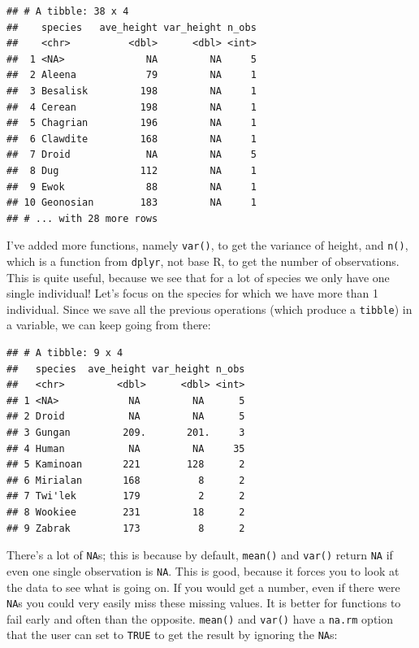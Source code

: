 \documentclass[]{gitbook}
\newenvironment{Shaded}{\begin{snugshade}}{\end{snugshade}}
\newcommand{\DecValTok}[1]{\textcolor[rgb]{0.00,0.00,0.81}{#1}}
\newcommand{\KeywordTok}[1]{\textcolor[rgb]{0.13,0.29,0.53}{\textbf{#1}}}
\newcommand{\NormalTok}[1]{#1}
\newcommand{\OperatorTok}[1]{\textcolor[rgb]{0.81,0.36,0.00}{\textbf{#1}}}
\newcommand{\StringTok}[1]{\textcolor[rgb]{0.31,0.60,0.02}{#1}}
\begin{document}
\begin{verbatim}
## # A tibble: 38 x 4
##    species   ave_height var_height n_obs
##    <chr>          <dbl>      <dbl> <int>
##  1 <NA>              NA         NA     5
##  2 Aleena            79         NA     1
##  3 Besalisk         198         NA     1
##  4 Cerean           198         NA     1
##  5 Chagrian         196         NA     1
##  6 Clawdite         168         NA     1
##  7 Droid             NA         NA     5
##  8 Dug              112         NA     1
##  9 Ewok              88         NA     1
## 10 Geonosian        183         NA     1
## # ... with 28 more rows
\end{verbatim}

I've added more functions, namely \texttt{var()}, to get the variance of height, and \texttt{n()}, which
is a function from \texttt{dplyr}, not base R, to get the number of observations. This is quite useful,
because we see that for a lot of species we only have one single individual! Let's focus on the
species for which we have more than 1 individual. Since we save all the previous operations (which
produce a \texttt{tibble}) in a variable, we can keep going from there:

\begin{Shaded}
\end{Shaded}

\begin{verbatim}
## # A tibble: 9 x 4
##   species  ave_height var_height n_obs
##   <chr>         <dbl>      <dbl> <int>
## 1 <NA>            NA         NA      5
## 2 Droid           NA         NA      5
## 3 Gungan         209.       201.     3
## 4 Human           NA         NA     35
## 5 Kaminoan       221        128      2
## 6 Mirialan       168          8      2
## 7 Twi'lek        179          2      2
## 8 Wookiee        231         18      2
## 9 Zabrak         173          8      2
\end{verbatim}

There's a lot of \texttt{NA}s; this is because by default, \texttt{mean()} and \texttt{var()} return \texttt{NA} if even one
single observation is \texttt{NA}. This is good, because it forces you to look at the data
to see what is going on. If you would get a number, even if there were \texttt{NA}s you could very easily
miss these missing values. It is better for functions to fail early and often than the opposite.
\texttt{mean()} and \texttt{var()} have a \texttt{na.rm} option that the user can set to \texttt{TRUE} to get the result by
ignoring the \texttt{NA}s:
\end{document}
